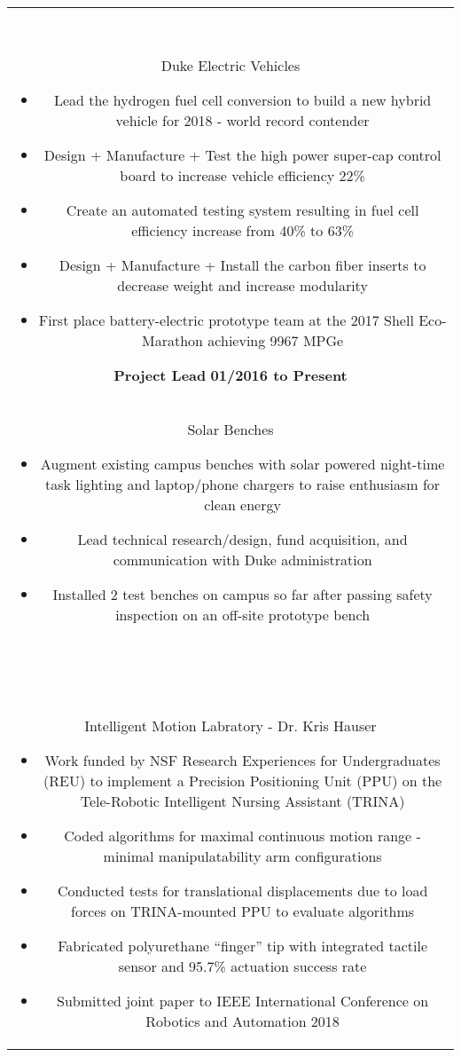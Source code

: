 \documentclass[11pt]{amsart}
\newcommand*\ruleline[1]{\par\noindent\raisebox{.8ex}{\makebox[\linewidth]{\hrulefill\hspace{1ex}\raisebox{-.8ex}{\Large~#1~}\hspace{1ex}\hrulefill}}\\ \-\ \vspace{-1em}}
\begin{document}
\begin{center}
\begin{tabular}{c}
	\ruleline{Activities}
	\begin{minipage}{\textwidth}
		{\bf Engineer} \hfill {\bf 08/2015 to Present}\\
		{Duke Electric Vehicles}
		\begin{itemize}
			\item Lead the hydrogen fuel cell conversion to build a new hybrid vehicle for 2018 - world record contender
			\item Design + Manufacture + Test the high power super-cap control board to increase vehicle efficiency 22\%
			\item Create an automated testing system resulting in fuel cell efficiency increase from 40\% to 63\%
			\item Design + Manufacture + Install the carbon fiber inserts to decrease weight and increase modularity
			\item First place battery-electric prototype team at the 2017 Shell Eco-Marathon achieving 9967 MPGe
		\end{itemize}
		{\bf Project Lead} \hfill {\bf 01/2016 to Present}\\
		{Solar Benches}
		\begin{itemize}
			\item Augment existing campus benches with solar powered night-time task lighting and laptop/phone chargers to raise enthusiasm for clean energy
			\item Lead technical research/design, fund acquisition, and communication with Duke administration
			\item Installed 2 test benches on campus so far after passing safety inspection on an off-site prototype bench		\end{itemize}
	\end{minipage}\\~\\
	
	\ruleline{Work History}
	\begin{minipage}{\textwidth}
		{\bf Robotics Motion Planning Intern} \hfill {\bf 01/2017 to Present}\\
		{Intelligent Motion Labratory - Dr. Kris Hauser}
		\begin{itemize}
			\item Work funded by NSF Research Experiences for Undergraduates (REU) to implement a Precision Positioning Unit (PPU) on the Tele-Robotic Intelligent Nursing Assistant (TRINA)
			\item Coded algorithms for maximal continuous motion range - minimal manipulatability arm configurations
			\item Conducted tests for translational displacements due to load forces on TRINA-mounted PPU to evaluate algorithms
			\item Fabricated polyurethane ``finger'' tip with integrated tactile sensor and 95.7\% actuation success rate
			\item Submitted joint paper to IEEE International Conference on Robotics and Automation 2018
		\end{itemize}
		

\end{minipage}
\end{tabular}
\end{center}
\end{document}
